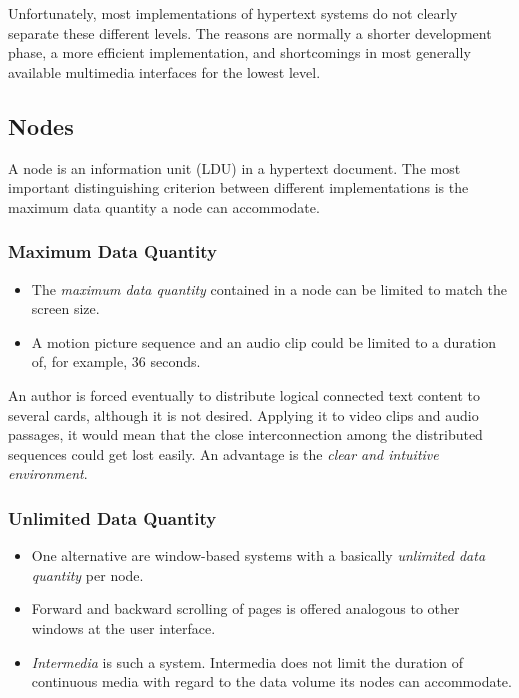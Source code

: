 \noindent Unfortunately, most implementations of hypertext systems do not clearly separate these different levels. The reasons are normally a shorter development phase, a more efficient implementation, and shortcomings in most generally available multimedia interfaces for the lowest level.

\subsection{Nodes}
A node is an information unit (LDU) in a hypertext document. The most important distinguishing criterion between different implementations is the maximum data quantity a node can accommodate.

\subsubsection{Maximum Data Quantity}

\begin{multicols}{2}
	\begin{itemize}
		\item The \textit{maximum data quantity} contained in a node can be limited to match the screen size.
		\item A motion picture sequence and an audio clip could be limited to a duration of, for example, 36 seconds.
	\end{itemize}
\end{multicols}
An author is forced eventually to distribute logical connected text content to several cards, although it is not desired. Applying it to video clips and audio passages, it would mean that the close interconnection among the distributed sequences could get lost easily. An advantage is the \textit{clear and intuitive environment}.


\subsubsection{Unlimited Data Quantity}
\begin{multicols}{2}
	\begin{itemize}
		\item One alternative are window-based systems with a basically \textit{unlimited data quantity} per node. 
		\item Forward and backward scrolling of pages is offered analogous to other windows at the user interface. 
		\item \textit{Intermedia} is such a system. Intermedia does not limit the duration of continuous media with regard to the data volume its nodes can accommodate.
	\end{itemize}
\end{multicols}

